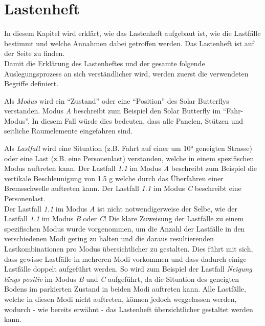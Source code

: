 \section{Lastenheft}
\label{Lastenheft}
In diesem Kapitel wird erklärt, wie das Lastenheft aufgebaut ist, wie die Lastfälle bestimmt und welche Annahmen dabei getroffen werden. Das Lastenheft ist auf der Seite \pageref{Lastenheft A} zu finden.\\

Damit die Erklärung des Lastenheftes und der gesamte folgende Auslegungsprozess an sich verständlicher wird, werden zuerst die verwendeten Begriffe definiert.

Als \emph{Modus} wird ein ``Zustand'' oder eine ``Position'' des Solar Butterflys verstanden. Modus \emph{A} beschreibt zum Beispiel den Solar Butterfly im ``Fahr-Modus''. In diesem Fall würde dies bedeuten, dass alle Panelen, Stützen und seitliche Raumelemente eingefahren sind.

Als \emph{Lastfall} wird eine Situation (z.B. Fahrt auf einer um 10° geneigten Strasse) oder eine Last (z.B. eine Personenlast) verstanden, welche in einem spezifischen Modus auftreten kann. Der Lastfall \emph{1.1} im Modus \emph{A} beschreibt zum Beispiel die vertikale Beschleunigung von 1.5 g welche durch das Überfahren einer Bremsschwelle auftreten kann. Der Lastfall \emph{1.1} im Modus \emph{C} beschreibt eine Personenlast.\\
Der Lastfall \emph{1.1} im Modus \emph{A} ist nicht notwendigerweise der Selbe, wie der Lastfall \emph{1.1} im Modus \emph{B} oder \emph{C}! Die klare Zuweisung der Lastfälle zu einem spezifischen Modus wurde vorgenommen, um die Anzahl der Lastfälle in den verschiedenen Modi gering zu halten und die daraus resultierenden Lastkombinationen pro Modus übersichtlicher zu gestalten. Dies führt mit sich, dass gewisse Lastfälle in mehreren Modi vorkommen und dass dadurch einige Lastfälle doppelt aufgeführt werden. So wird zum Beispiel der Lastfall \emph{Neigung längs positiv} im Modus \emph{B} und \emph{C} aufgeführt, da die Situation des geneigten Bodens im parkierten Zustand in beiden Modi auftreten kann. Alle Lastfälle, welche in diesen Modi nicht auftreten, können jedoch weggelassen werden, wodurch - wie bereits erwähnt - das Lastenheft übersichtlicher gestaltet werden kann.

